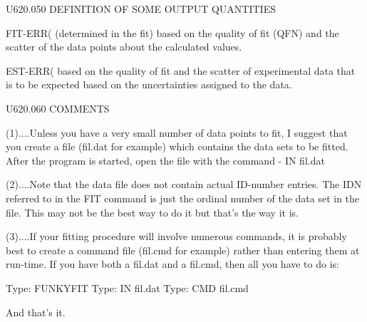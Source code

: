  
 
   U620.050  DEFINITION OF SOME OUTPUT QUANTITIES
 
   FIT-ERR(%
          (determined in the fit) based on the quality of fit  (QFN)  and  the
          scatter of the data points about the calculated values.
 
   EST-ERR(%
          based on the quality of fit and the  scatter  of  experimental  data
          that  is  to  be expected based on the uncertainties assigned to the
          data.
 
   U620.060  COMMENTS
 
   (1)....Unless you have a very  small  number  of  data  points  to  fit,  I
          suggest  that you create a file (fil.dat for example) which contains
          the data sets to be fitted. After the program is started,  open  the
          file with the command - IN fil.dat
 
   (2)....Note  that  the data file does not contain actual ID-number entries.
          The IDN referred to in the FIT command is just  the  ordinal  number
          of  the  data set in the file. This may not be the best way to do it
          but that's the way it is.
 
   (3)....If your fitting procedure will  involve  numerous  commands,  it  is
          probably  best to create a command file (fil.cmd for example) rather
          than entering them at run-time. If you have both  a  fil.dat  and  a
          fil.cmd, then all you have to do is:
 
   Type:  FUNKYFIT
   Type:  IN   fil.dat
   Type:  CMD  fil.cmd
 
   And that's it.
